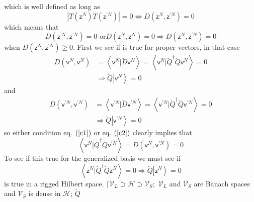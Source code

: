 \documentclass[aps,preprint]{revtex4}%
\begin{document}
which is well defined as long as
\begin{equation}
\left\vert T\left(  \mathsf{z}^{N}\right)  T\left(  \mathsf{z}^{\prime
N}\right)  \right\vert =0\Longleftrightarrow D\left(  \mathsf{z}%
^{N},\mathsf{z}^{\prime N}\right)  =0
\end{equation}
which means that
\begin{equation}
D\left(  \mathsf{z}^{\prime N},\mathsf{z}^{\prime N}\right)  =0\text{ or
}D\left(  \mathsf{z}^{N},\mathsf{z}^{N}\right)  =0\Longrightarrow D\left(
\mathsf{z}^{N},\mathsf{z}^{\prime N}\right)  =0
\end{equation}
when $D\left(  \mathsf{z}^{N},\mathsf{z}^{\prime N}\right)  \geq0$. First we
see if is true for proper vectors, in that case
\begin{align}
D\left(  \mathsf{v}^{N},\mathsf{v}^{N}\right)   &  =\left\langle
\mathsf{v}^{N}|\breve{D}\mathsf{v}^{N}\right\rangle =\left\langle
\mathsf{v}^{N}|\breve{Q}^{\dagger}\breve{Q}\mathsf{v}^{N}\right\rangle
=0\nonumber\\
&  \Rightarrow\breve{Q}\left\vert \mathsf{v}^{N}\right\rangle =0 \label{c1}%
\end{align}
and
\begin{align}
D\left(  \mathsf{v}^{\prime N},\mathsf{v}^{\prime N}\right)   &  =\left\langle
\mathsf{v}^{\prime N}|\breve{D}\mathsf{v}^{\prime N}\right\rangle
=\left\langle \mathsf{v}^{\prime N}|\breve{Q}^{\dagger}\breve{Q}%
\mathsf{v}^{\prime N}\right\rangle =0\nonumber\\
&  \Rightarrow\breve{Q}\left\vert \mathsf{v}^{\prime N}\right\rangle =0
\label{c2}%
\end{align}
so either condition eq. $\left(  \ref{c1}\right)  $ or eq. $\left(
\ref{c2}\right)  $ clearly implies that
\begin{equation}
\left\langle \mathsf{v}^{N}|\breve{Q}^{\dagger}\breve{Q}\mathsf{v}^{\prime
N}\right\rangle =D\left(  \mathsf{v}^{N},\mathsf{v}^{\prime N}\right)  =0
\end{equation}
To see if this true for the generalized basis we must see if
\begin{equation}
\left\langle \mathsf{z}^{N}|\breve{Q}^{\dagger}\breve{Q}\mathsf{z}%
^{N}\right\rangle =0\Rightarrow\breve{Q}\left\vert \mathsf{z}^{N}\right\rangle
=0
\end{equation}
is true in a rigged Hilbert space. $\lceil\mathcal{V}_{L}\supset
\mathcal{H\supset}\mathcal{V}_{S};$ $\mathcal{V}_{L}$ and $\mathcal{V}_{S}$
are Banach spaces and $\mathcal{V}_{S}$ is dense in $\mathcal{H}$; $\breve{Q}$
\end{document}
